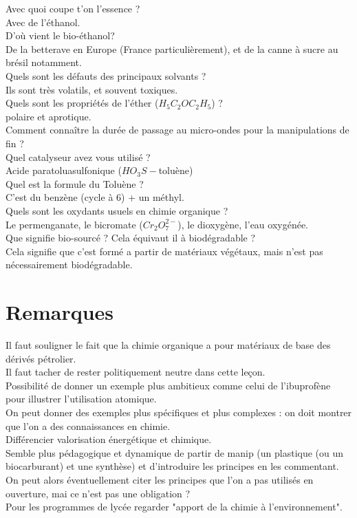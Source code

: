 \documentclass[12pt,prb,aps,epsf]{article}
\begin{document}
Avec quoi coupe t'on l'essence ?\\
Avec de l'éthanol.\\

D'où vient le bio-éthanol?\\
De la betterave en Europe (France particulièrement), et de la canne à sucre au brésil notamment.\\

Quels sont les défauts des principaux solvants ?\\
Ils sont très volatils, et souvent toxiques.\\

Quels sont les propriétés de l'éther ($H_5C_2OC_2H_5$) ?\\
polaire et aprotique.\\

Comment connaître la durée de passage au micro-ondes pour la manipulations de fin ?\\

Quel catalyseur avez vous utilisé ?\\
Acide paratoluasulfonique ($HO_3S-$toluène)\\

Quel est la formule du Toluène ?\\
C'est du benzène (cycle à 6) + un méthyl.\\

Quels sont les oxydants usuels en chimie organique ?\\
Le permenganate, le bicromate ($Cr_{2}O_7^{2-}$), le dioxygène, l'eau oxygénée.\\

Que signifie bio-sourcé ? Cela équivaut il à biodégradable ?\\
Cela signifie que c'est formé a partir de matériaux végétaux, mais n'est pas nécessairement biodégradable.

\section*{Remarques} 
Il faut souligner le fait que la chimie organique a pour matériaux de base des dérivés pétrolier.\\
Il faut tacher de rester politiquement neutre dans cette leçon.\\
Possibilité de donner un exemple plus ambitieux comme celui de l'ibuprofène pour illustrer l'utilisation atomique.\\
On peut donner des exemples plus spécifiques et plus complexes : on doit montrer que l'on a des connaissances en chimie.\\
Différencier valorisation énergétique et chimique.\\
Semble plus pédagogique et dynamique de partir de manip (un plastique (ou un biocarburant) et une synthèse) et d'introduire les principes en les commentant. On peut alors éventuellement citer les principes que l'on a pas utilisés en ouverture, mai ce n'est pas une obligation ?\\
Pour les programmes de lycée regarder "apport de la chimie à l'environnement".
\end{document}

